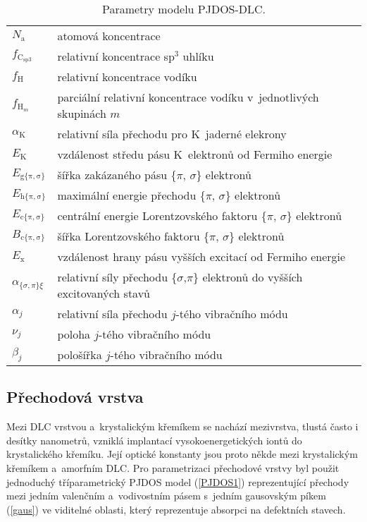\begin{table}
\centering
\begin{tabular}{l l}
\hline

$N_\mathrm{a}$ & atomová koncentrace \\
$f_\mathrm{C_{sp3}}$ & relativní koncentrace sp$^3$ uhlíku \\
$f_\mathrm{H}$ & relativní koncentrace vodíku \\
$f_{\mathrm{H}_m}$ & parciální relativní koncentrace vodíku v~jednotlivých skupinách $m$\\

$\alpha_\mathrm{K}$ & relativní síla přechodu pro K~jaderné elekrony\\
$E_\mathrm{K}$ & vzdálenost středu pásu K~elektronů od Fermiho energie\\

$E_\mathrm{g\{\pi,\sigma\}}$ & šířka zakázaného pásu \{$\pi$, $\sigma$\} elektronů\\
$E_\mathrm{h\{\pi,\sigma\}}$ & maximální energie přechodu \{$\pi$, $\sigma$\} elektronů\\
$E_\mathrm{c\{\pi,\sigma\}}$ & centrální energie Lorentzovského faktoru \{$\pi$, $\sigma$\} elektronů\\
$B_\mathrm{c\{\pi,\sigma\}}$ & šířka Lorentzovského faktoru \{$\pi$, $\sigma$\} elektronů\\

$E_\mathrm{x}$ & vzdálenost hrany pásu vyšších excitací od Fermiho energie\\
$\alpha_{\{\sigma,\pi\}\xi}$ & relativní síly přechodu \{$\sigma$,$\pi$\} elektronů do vyšších excitovaných stavů \\

$\alpha_j$ & relativní síla přechodu $j$-tého vibračního módu \\
$\nu_j$ & poloha $j$-tého vibračního módu\\
$\beta_j$ & pološířka $j$-tého vibračního módu\\
\hline

\end{tabular}
\label{DLCparametry}
\caption{Parametry modelu PJDOS-DLC.}
\end{table}

\subsection{Přechodová vrstva}
Mezi DLC vrstvou a~krystalickým křemíkem se nachází mezivrstva, tlustá často i desítky nanometrů, vzniklá implantací vysokoenergetických iontů do krystalického křemíku. Její optické konstanty jsou proto někde mezi krystalickým křemíkem a~amorfním DLC. Pro parametrizaci přechodové vrstvy byl použit jednoduchý tříparametrický PJDOS model (\ref{PJDOS1}) reprezentující přechody mezi jedním valenčním a~vodivostním pásem s~jedním gausovským píkem (\ref{gaus}) ve viditelné oblasti, který reprezentuje absorpci na defektních stavech.

